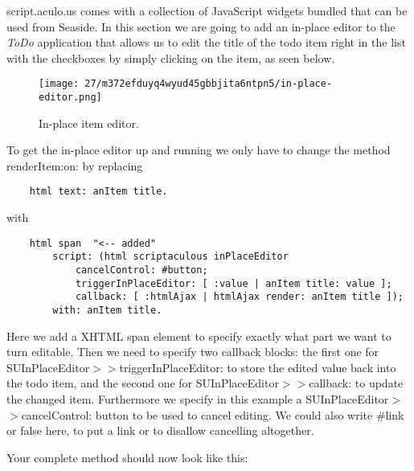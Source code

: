 \documentclass[a4paper,10pt,twoside]{book}
\newcommand{\ct}[1]{{\small\ttfamily\textup{#1}}}
\begin{document}
script.aculo.us comes with a collection of JavaScript widgets bundled that can be used from Seaside. In this section we are going to add an in-place editor to the \textit{ToDo} application that allows us to edit the title of the todo item right in the list with the checkboxes by simply clicking on the item, as seen below.

\begin{figure}[h!tbp]
	\begin{center}
		\texttt{[image: 27/m372efduyq4wyud45gbbjita6ntpn5/in-place-editor.png]}
		\caption{In-place item editor.\label{book:web20:scriptaculous:controls:inplaceeditor}}
	\end{center}
\end{figure}


To get the in-place editor up and running we only have to change the method \ct{renderItem:on:} by replacing

\begin{lstlisting}
    html text: anItem title.
\end{lstlisting}

with 

\begin{lstlisting}
    html span  "<-- added"
        script: (html scriptaculous inPlaceEditor
            cancelControl: #button;
            triggerInPlaceEditor: [ :value | anItem title: value ];
            callback: [ :htmlAjax | htmlAjax render: anItem title ]);
        with: anItem title.
\end{lstlisting}

Here we add a XHTML \ct{span} element to specify exactly what part we want to turn editable. Then we need to specify two callback blocks: the first one for  \ct{SUInPlaceEditor$>$$>$triggerInPlaceEditor:} to store the edited value back into the todo item, and the second one for  \ct{SUInPlaceEditor$>$$>$callback:} to update the changed item. Furthermore we specify in this example a  \ct{SUInPlaceEditor$>$$>$cancelControl:} button to be used to cancel editing. We could also write \ct{\#link} or \ct{false} here, to put a link or to disallow cancelling altogether.

Your complete method should now look like this:
\end{document}
